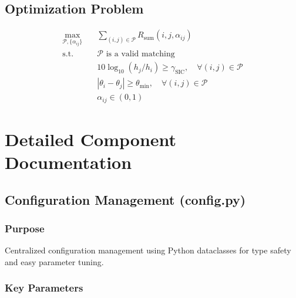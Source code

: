 \documentclass[12pt,a4paper]{article}
\begin{document}
\subsection{Optimization Problem}
\begin{align}
\max_{\mathcal{P}, \{\alpha_{ij}\}} \quad & \sum_{(i,j) \in \mathcal{P}} R_{\text{sum}}(i,j,\alpha_{ij}) \\
\text{s.t.} \quad & \mathcal{P} \text{ is a valid matching} \\
& 10 \log_{10}(h_j/h_i) \geq \gamma_{\text{SIC}}, \quad \forall (i,j) \in \mathcal{P} \\
& |\theta_i - \theta_j| \geq \theta_{\min}, \quad \forall (i,j) \in \mathcal{P} \\
& \alpha_{ij} \in (0, 1)
\end{align}

\section{Detailed Component Documentation}

\subsection{Configuration Management (config.py)}

\subsubsection{Purpose}
Centralized configuration management using Python dataclasses for type safety and easy parameter tuning.

\subsubsection{Key Parameters}
\end{document}
